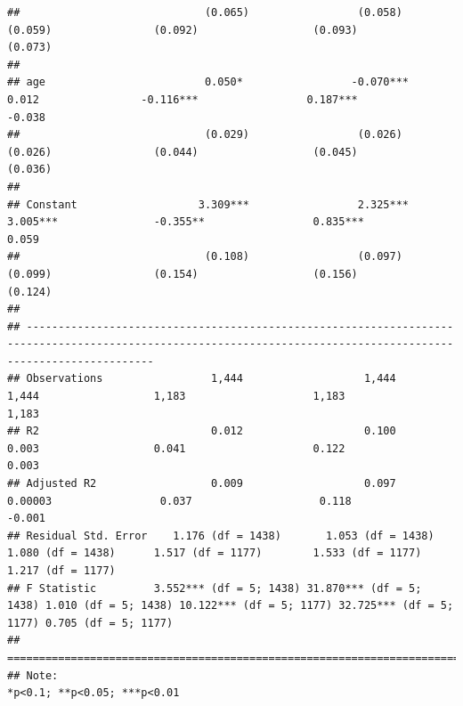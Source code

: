 \documentclass[
]{article}
\begin{document}
\begin{verbatim}
##                             (0.065)                 (0.058)                (0.059)                (0.092)                  (0.093)                (0.073)       
##                                                                                                                                                                 
## age                         0.050*                 -0.070***                0.012                -0.116***                 0.187***                -0.038       
##                             (0.029)                 (0.026)                (0.026)                (0.044)                  (0.045)                (0.036)       
##                                                                                                                                                                 
## Constant                   3.309***                 2.325***               3.005***               -0.355**                 0.835***                0.059        
##                             (0.108)                 (0.097)                (0.099)                (0.154)                  (0.156)                (0.124)       
##                                                                                                                                                                 
## ----------------------------------------------------------------------------------------------------------------------------------------------------------------
## Observations                 1,444                   1,444                  1,444                  1,183                    1,183                  1,183        
## R2                           0.012                   0.100                  0.003                  0.041                    0.122                  0.003        
## Adjusted R2                  0.009                   0.097                 0.00003                 0.037                    0.118                  -0.001       
## Residual Std. Error    1.176 (df = 1438)       1.053 (df = 1438)      1.080 (df = 1438)      1.517 (df = 1177)        1.533 (df = 1177)      1.217 (df = 1177)  
## F Statistic         3.552*** (df = 5; 1438) 31.870*** (df = 5; 1438) 1.010 (df = 5; 1438) 10.122*** (df = 5; 1177) 32.725*** (df = 5; 1177) 0.705 (df = 5; 1177)
## ================================================================================================================================================================
## Note:                                                                                                                                *p<0.1; **p<0.05; ***p<0.01
\end{verbatim}
\end{document}
